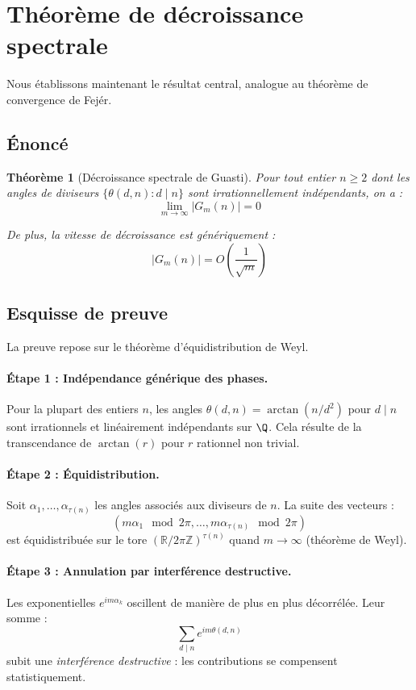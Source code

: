 \documentclass[12pt,a4paper]{article}
\newtheorem{theorem}{Théorème}[section]
\theoremstyle{definition}
\theoremstyle{remark}
\newcommand{\Gm}[2]{G_{#1}(#2)}              %
\newcommand{\thetaG}[2]{\theta(#1,#2)}       %
\DeclareMathOperator{\arctan}{arctan}
\newcommand{\R}{\mathbb{R}}
\newcommand{\Z}{\mathbb{Z}}
\begin{document}
\section{Théorème de décroissance spectrale}

Nous établissons maintenant le résultat central, analogue au théorème de convergence de Fejér.

\subsection{Énoncé}

\begin{theorem}[Décroissance spectrale de Guasti]
Pour tout entier $n \geq 2$ dont les angles de diviseurs $\{\thetaG{d}{n} : d \mid n\}$ sont irrationnellement indépendants, on a :
\[
\lim_{m \to \infty} |\Gm{m}{n}| = 0
\]

De plus, la vitesse de décroissance est génériquement :
\[
|\Gm{m}{n}| = O\left(\frac{1}{\sqrt{m}}\right)
\]
\end{theorem}

\subsection{Esquisse de preuve}

La preuve repose sur le théorème d'équidistribution de Weyl.

\paragraph{Étape 1 : Indépendance générique des phases.}
Pour la plupart des entiers $n$, les angles $\thetaG{d}{n} = \arctan(n/d^2)$ pour $d \mid n$ sont irrationnels et linéairement indépendants sur $\Q$. Cela résulte de la transcendance de $\arctan(r)$ pour $r$ rationnel non trivial.

\paragraph{Étape 2 : Équidistribution.}
Soit $\alpha_1, \ldots, \alpha_{\tau(n)}$ les angles associés aux diviseurs de $n$. La suite des vecteurs :
\[
(m \alpha_1 \mod 2\pi, \ldots, m \alpha_{\tau(n)} \mod 2\pi)
\]
est équidistribuée sur le tore $(\R/2\pi\Z)^{\tau(n)}$ quand $m \to \infty$ (théorème de Weyl).

\paragraph{Étape 3 : Annulation par interférence destructive.}
Les exponentielles $e^{im\alpha_k}$ oscillent de manière de plus en plus décorrélée. Leur somme :
\[
\sum_{d \mid n} e^{im \thetaG{d}{n}}
\]
subit une \emph{interférence destructive} : les contributions se compensent statistiquement.
\end{document}

